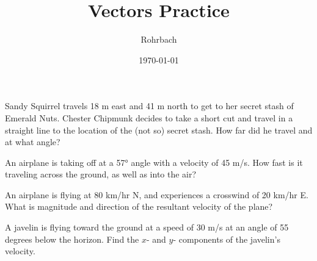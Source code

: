 \documentclass[10pt]{exam}
\title{Vectors Practice}
\author{Rohrbach}
\date{\today}
\begin{document}
\maketitle

\begin{questions}

\question
  Sandy Squirrel travels 18 m east and 41 m north to get to her secret stash of Emerald Nuts.  Chester Chipmunk decides to take a short cut and travel in a straight line to the location of the (not so) secret stash.  How far did he travel and at what angle?
  \vs

\question
  An airplane is taking off at a 57° angle with a velocity of 45 m/s.  How fast is it traveling across the ground, as well as into the air?
  \vs

\pagebreak

\question
  An airplane is flying at 80 km/hr N, and experiences a crosswind of 20 km/hr E.  What is magnitude and direction of the resultant velocity of the plane?
  \vs

\question
  A javelin is flying toward the ground at a speed of 30 m/s at an angle of 55 degrees below the horizon.  Find the $x$- and $y$- components of the javelin's velocity.
  \vs


\end{questions}
\end{document}
